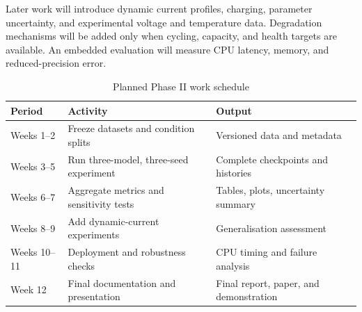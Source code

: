 \documentclass[14pt,a4paper,oneside]{extreport}
\begin{document}
Later work will introduce dynamic current profiles, charging, parameter uncertainty, and experimental voltage and temperature data. Degradation mechanisms will be added only when cycling, capacity, and health targets are available. An embedded evaluation will measure CPU latency, memory, and reduced-precision error.

\begin{table}[htbp]
\centering
\caption{Planned Phase II work schedule}
\small
\begin{tabularx}{\textwidth}{p{}p{}X}
\toprule
Period & Activity & Output\\
\midrule
Weeks 1--2 & Freeze datasets and condition splits & Versioned data and metadata\\
Weeks 3--5 & Run three-model, three-seed experiment & Complete checkpoints and histories\\
Weeks 6--7 & Aggregate metrics and sensitivity tests & Tables, plots, uncertainty summary\\
Weeks 8--9 & Add dynamic-current experiments & Generalisation assessment\\
Weeks 10--11 & Deployment and robustness checks & CPU timing and failure analysis\\
Week 12 & Final documentation and presentation & Final report, paper, and demonstration\\
\bottomrule
\end{tabularx}
\end{table}

\clearpage
\end{document}
